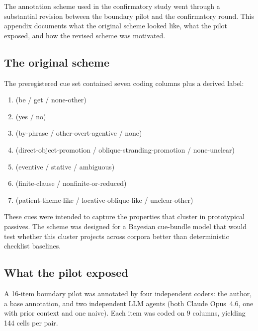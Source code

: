 \documentclass[12pt]{article}
\begin{document}
The annotation scheme used in the confirmatory study went through a substantial revision between the boundary pilot and the confirmatory round. This appendix documents what the original scheme looked like, what the pilot exposed, and how the revised scheme was motivated.

\subsection{The original scheme}

The preregistered cue set contained seven coding columns plus a derived  label:

\begin{enumerate}
\item {} (be / get / none-other)
\item {} (yes / no)
\item {} (by-phrase / other-overt-agentive / none)
\item {} (direct-object-promotion / oblique-stranding-promotion / none-unclear)
\item {} (eventive / stative / ambiguous)
\item {} (finite-clause / nonfinite-or-reduced)
\item {} (patient-theme-like / locative-oblique-like / unclear-other)
\end{enumerate}

These cues were intended to capture the properties that cluster in prototypical passives. The scheme was designed for a Bayesian cue-bundle model that would test whether this cluster projects across corpora better than deterministic checklist baselines.

\subsection{What the pilot exposed}

A 16-item boundary pilot was annotated by four independent coders: the author, a base annotation, and two independent LLM agents (both Claude Opus~4.6, one with prior context and one naive). Each item was coded on 9 columns, yielding 144 cells per pair.
\end{document}
